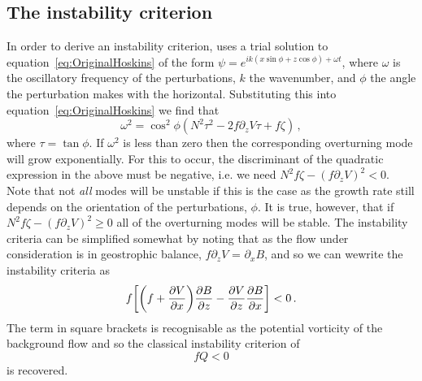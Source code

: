     \subsection{The instability criterion}
    In order to derive an instability criterion, \citet{Hoskins1974} uses a trial solution to equation~\ref{eq:OriginalHoskins} of the form $\psi = e^{i k(x\sin\phi + z\cos \phi) + \omega t}$, where $\omega$ is the oscillatory frequency of the perturbations, $k$ the wavenumber, and $\phi$ the angle the perturbation makes with the horizontal. Substituting this into equation~\ref{eq:OriginalHoskins} we find that
    \begin{equation}
        \label{eq:GrowthRate}
        \omega^2 = \cos^2\phi (N^2 \tau^2 - 2f\partial_zV\tau + f\zeta) \, ,
    \end{equation}
    where $\tau = \tan\phi$. If $\omega^2$ is less than zero then the corresponding overturning mode will grow exponentially. For this to occur, the discriminant of the quadratic expression in the above must be negative, i.e. we need $N^2 f \zeta - (f\partial_z V)^2 < 0$. Note that not \textit{all} modes will be unstable if this is the case as the growth rate still depends on the orientation of the perturbations, $\phi$. It is true, however, that if $N^2 f \zeta - (f\partial_z V)^2 \geq 0$ all of the overturning modes will be stable. The instability criteria can be simplified somewhat by noting that as the flow under consideration is in geostrophic balance, $f\partial_zV$ = $\partial_x B$, and so we can wewrite the instability criteria as
    \begin{equation}
        f \bigg[\bigg(f + \pdv{V}{x}\bigg)\pdv{B}{z} - \pdv{V}{z}\pdv{B}{x}\bigg] < 0 \, .
    \end{equation}
    The term in square brackets is recognisable as the potential vorticity of the background flow and so the classical instability criterion of
    \begin{equation}
        f Q < 0
    \end{equation}
    is recovered.

